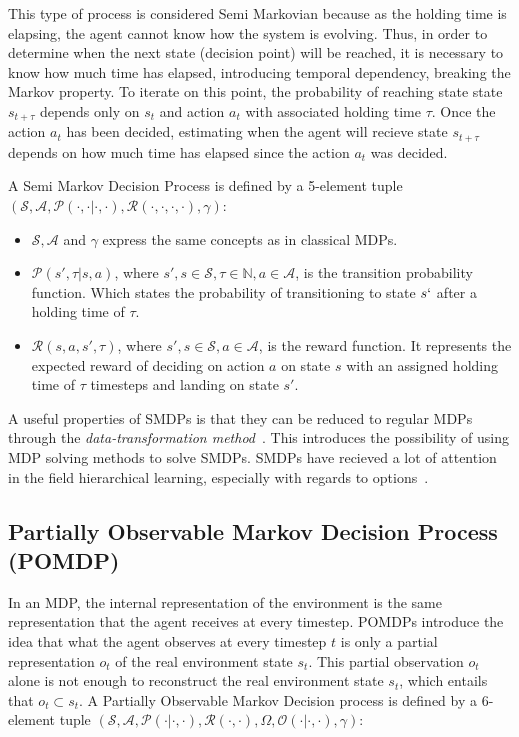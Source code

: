 \documentclass{../main.tex}{subfile}
\begin{document}
This type of process is considered Semi Markovian because as the holding time is elapsing, the agent cannot know how the system is evolving. Thus, in order to determine when the next state (decision point) will be reached, it is necessary to know how much time has elapsed, introducing temporal dependency, breaking the Markov property. To iterate on this point, the probability of reaching state state $s_{t+\tau}$ depends only on $s_t$ and action $a_t$ with associated holding time $\tau$. Once the action $a_t$ has been decided, estimating when the agent will recieve state $s_{t+\tau}$ depends on how much time has elapsed since the action $a_t$ was decided.

A Semi Markov Decision Process is defined by a 5-element tuple $(\mathcal{S}, \mathcal{A}, \mathcal{P}(\cdot, \cdot | \cdot, \cdot), \mathcal{R}(\cdot, \cdot, \cdot, \cdot), \gamma)$:
\begin{itemize}
    \item $\mathcal{S}, \mathcal{A}$ and $\gamma$ express the same concepts as in classical MDPs.
    \item $\mathcal{P}(s', \tau | s, a)$, where $s',s \in \mathcal{S}, \tau \in \mathbb{N}, a \in \mathcal{A}$, is the transition probability function. Which states the probability of transitioning to state $s`$ after a holding time of $\tau$.
    \item $\mathcal{R}(s, a, s', \tau)$, where $s',s \in \mathcal{S}, a \in \mathcal{A}$, is the reward function. It represents the expected reward of deciding on action $a$ on state $s$ with an assigned holding time of $\tau$ timesteps and landing on state $s'$.
\end{itemize}


A useful properties of SMDPs is that they can be reduced to regular MDPs through the \textit{data-transformation method}~\citep{Piunovskiy2012}. This introduces the possibility of using MDP solving methods to solve SMDPs. SMDPs have recieved a lot of attention in the field hierarchical learning, especially with regards to options~\citep{Sutton1998}.

\subsection{Partially Observable Markov Decision Process (POMDP)}
In an MDP, the internal representation of the environment is the same representation that the agent receives at every timestep. POMDPs introduce the idea that what the agent observes at every timestep $t$ is only a partial representation $o_t$ of the real environment state $s_t$. This partial observation $o_t$ alone is not enough to reconstruct the real environment state $s_t$, which entails that $o_t \subset s_t$. A Partially Observable Markov Decision process is defined by a 6-element tuple $(\mathcal{S}, \mathcal{A}, \mathcal{P}(\cdot | \cdot, \cdot), \mathcal{R}(\cdot, \cdot), \Omega, \mathcal{O}(\cdot | \cdot, \cdot), \gamma)$:
\end{document}
